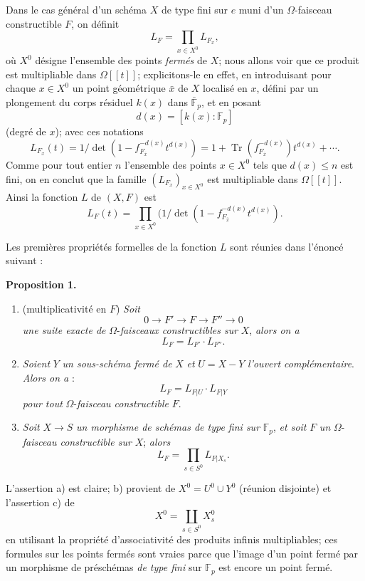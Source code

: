 \documentclass[11pt]{article}
\newenvironment{statement}[1]{\par\medskip\noindent\textbf{#1.}\ }{\par\medskip}
\providecommand{\Tr}{\operatorname{Tr}}
\providecommand{\Tr}{\operatorname{Tr}}
\providecommand{\Tr}{\operatorname{Tr}}
\providecommand{\Tr}{\operatorname{Tr}}
\providecommand{\Tr}{\operatorname{Tr}}
\begin{document}
Dans le cas
général d'un schéma $X$ de type fini sur $e$ muni d'un $\Omega$-faisceau constructible $F$, on définit
\[
L_F=\prod_{x\in X^0}L_{F_x},
\]
où $X^0$ désigne l'ensemble des points \emph{fermés} de $X$; nous allons voir que ce produit est multipliable dans $\Omega[[t]]$; explicitons-le en effet, en introduisant pour chaque $x\in X^0$ un point géométrique $\bar x$ de $X$ localisé en $x$, défini par un plongement du corps résiduel $k(x)$ dans $\bar{\mathbb F}_p$, et en posant
\[
d(x)=[k(x):\mathbb F_p]
\]
(degré de $x$); avec ces notations
\[
L_{F_x}(t)=1/\det(1-f_{F_{\bar x}}^{-d(x)}t^{d(x)})
 =1+\Tr(f_{F_{\bar x}}^{-d(x)})t^{d(x)}+\cdots .
\]
Comme pour tout entier $n$ l'ensemble des points $x\in X^0$ tels que $d(x)\le n$ est fini, on en conclut que la famille $(L_{F_x})_{x\in X^0}$ est multipliable dans $\Omega[[t]]$. Ainsi la fonction $L$ de $(X,F)$ est
\[
L_F(t)=\prod_{x\in X^0}(1/\det(1-f_{F_{\bar x}}^{-d(x)}t^{d(x)}).
\]

Les premières propriétés formelles de la fonction $L$ sont réunies dans l'énoncé suivant :

\begin{statement}{Proposition 1}
\begin{enumerate}[label=\alph*)]
\item (multiplicativité en $F$) \emph{Soit}
\[
0\longrightarrow F'\longrightarrow F\longrightarrow F''\longrightarrow0
\]
\emph{une
suite exacte de} $\Omega$-\emph{faisceaux constructibles sur} $X$, \emph{alors on a}
\[
L_F=L_{F'}\cdot L_{F''}.
\]
\item \emph{Soient} $Y$ \emph{un sous-schéma fermé de} $X$ \emph{et} $U=X-Y$ \emph{l'ouvert complémentaire}. \emph{Alors on a} :
\[
L_F=L_{F|U}\cdot L_{F|Y}
\]
\emph{pour tout} $\Omega$-\emph{faisceau constructible} $F$.
\item \emph{Soit} $X\to S$ \emph{un morphisme de schémas de type fini sur} $\mathbb F_p$, \emph{et soit} $F$ \emph{un} $\Omega$-\emph{faisceau constructible sur} $X$; \emph{alors}
\[
L_F=\prod_{s\in S^0}L_{F|X_s}.
\]
\end{enumerate}
\end{statement}

L'assertion a) est claire; b) provient de $X^0=U^0\cup Y^0$ (réunion disjointe) et l'assertion c) de
\[
X^0=\coprod_{s\in S^0}X_s^0
\]
en utilisant la propriété d'associativité des produits infinis multipliables; ces formules sur les points fermés sont vraies parce que l'image d'un point fermé par un morphisme de préschémas \emph{de type fini} sur $\mathbb F_p$ est encore un point fermé.
\end{document}
